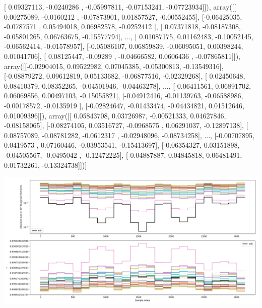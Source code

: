 \documentclass{article}
\begin{document}
       [ 0.09327113, -0.0240286 , -0.05997811, -0.07153241, -0.07723934]]), array([[ 0.00275089, -0.0160212 , -0.07873901,  0.01857527, -0.00552455],
       [-0.06425035, -0.0787571 ,  0.05494018,  0.06982578, -0.0252412 ],
       [ 0.07371818, -0.08187308, -0.05801265,  0.06763675, -0.15577794],
       ..., 
       [ 0.01087175,  0.01162483, -0.10052145, -0.06562414, -0.01578957],
       [-0.05086107,  0.06859839, -0.06095051,  0.00398244,  0.01041706],
       [ 0.08125447, -0.09289   , -0.04666582,  0.0606436 , -0.07865811]]), array([[-0.02904015,  0.09522982,  0.07045385, -0.05300813, -0.13549316],
       [-0.08879272,  0.09612819,  0.05133682, -0.06877516, -0.02329268],
       [ 0.02450648,  0.08410379,  0.08352265, -0.04501946, -0.04463278],
       ..., 
       [-0.06411561,  0.06891702,  0.06069856,  0.00497103, -0.15055821],
       [-0.04912416, -0.01139763, -0.06588986, -0.00178572, -0.0135919 ],
       [-0.02824647, -0.01433474, -0.04434821,  0.01512646,  0.01009396]]), array([[ 0.05843708,  0.03726987, -0.00521333,  0.04627846, -0.08158065],
       [-0.08274105,  0.03516727, -0.0968575 ,  0.06291037, -0.12897138],
       [ 0.08757089, -0.08781282, -0.0612317 , -0.02948096, -0.08734258],
       ..., 
       [-0.00707895,  0.0419573 ,  0.07160446, -0.03953541, -0.15413697],
       [-0.06354327,  0.03151898, -0.04505567, -0.0495042 , -0.12472225],
       [-0.04887887,  0.04845818,  0.06481491,  0.01732261, -0.13324738]])]
\begin{center}
\includegraphics[scale=.9]{report_pickled_controls256/control_dpn_all.png}

\end{center}
\end{document}
